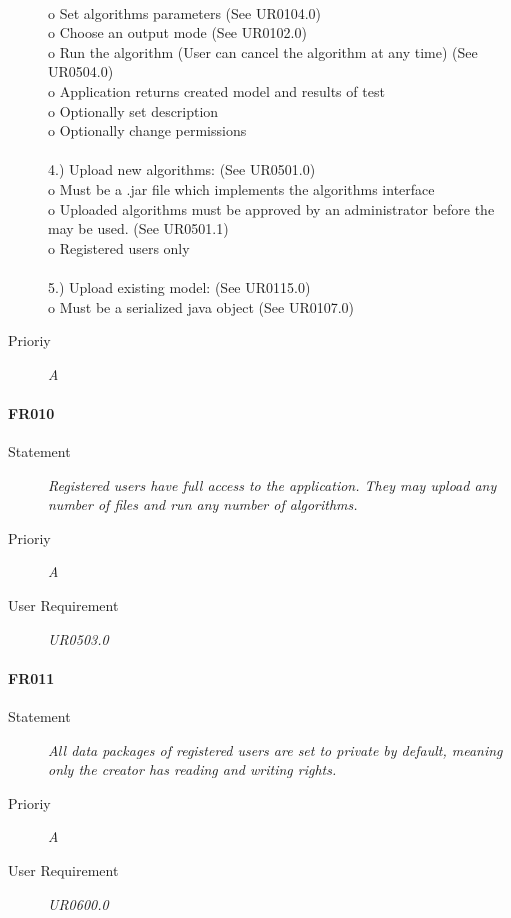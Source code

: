 \begin{description}
{\\o   Set algorithms parameters (See UR0104.0)
\\o   Choose an output mode (See UR0102.0)
\\o   Run the algorithm (User can cancel the algorithm at any time) (See UR0504.0)
\\o   Application returns created model and results of test
\\o   Optionally set description
\\o   Optionally change permissions
\\
\\4.) Upload new algorithms: (See UR0501.0)
\\o   Must be a .jar file which implements the algorithms interface
\\o   Uploaded algorithms must be approved by an administrator before the may be used. (See UR0501.1)
\\o Registered users only
\\
\\5.) Upload existing model: (See UR0115.0)
\\o   Must be a serialized java object (See UR0107.0) 
}
  \item [Prioriy] \textit{A}
\end{description}

\paragraph{FR010}
\begin{description}
  \item [Statement]
    \textit{
Registered users have full access to the application. They may upload any number of files and run any number of algorithms.
}
  \item [Prioriy] \textit{A}
  \item[User Requirement] \textit{UR0503.0}
\end{description}

\paragraph{FR011}
\begin{description}
  \item [Statement]
    \textit{
All data packages of registered users are set to private by default, meaning only the creator has reading and writing rights.
}
  \item [Prioriy] \textit{A}
  \item[User Requirement] \textit{UR0600.0}
\end{description}

